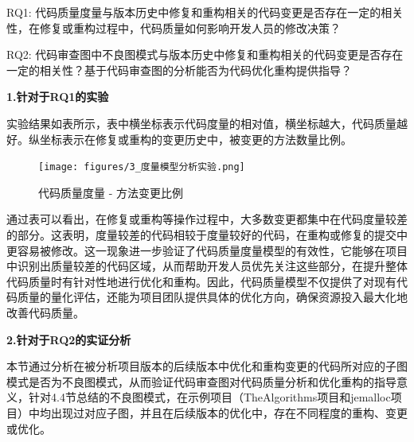 RQ1: 代码质量度量与版本历史中修复和重构相关的代码变更是否存在一定的相关性，在修复或重构过程中，代码质量如何影响开发人员的修改决策？

RQ2: 代码审查图中不良图模式与版本历史中修复和重构相关的代码变更是否存在一定的相关性？基于代码审查图的分析能否为代码优化重构提供指导？


\textbf{1.针对于RQ1的实验}


实验结果如表所示，表中横坐标表示代码度量的相对值，横坐标越大，代码质量越好。纵坐标表示在修复或重构的变更历史中，被变更的方法数量比例。

\begin{figure}[h]
\centering
\texttt{[image: figures/3\_度量模型分析实验.png]}
\caption{代码质量度量 - 方法变更比例}
\label{1_度量模型分析实验}
\end{figure}


通过表可以看出，在修复或重构等操作过程中，大多数变更都集中在代码度量较差的部分。这表明，度量较差的代码相较于度量较好的代码，在重构或修复的提交中更容易被修改。这一现象进一步验证了代码质量度量模型的有效性，它能够在项目中识别出质量较差的代码区域，从而帮助开发人员优先关注这些部分，在提升整体代码质量时有针对性地进行优化和重构。因此，代码质量模型不仅提供了对现有代码质量的量化评估，还能为项目团队提供具体的优化方向，确保资源投入最大化地改善代码质量。

\textbf{2.针对于RQ2的实证分析}

本节通过分析在被分析项目版本的后续版本中优化和重构变更的代码所对应的子图模式是否为不良图模式，从而验证代码审查图对代码质量分析和优化重构的指导意义，针对4.4节总结的不良图模式，在示例项目（TheAlgorithms项目和jemalloc项目）中均出现过对应子图，并且在后续版本的优化中，存在不同程度的重构、变更或优化。

